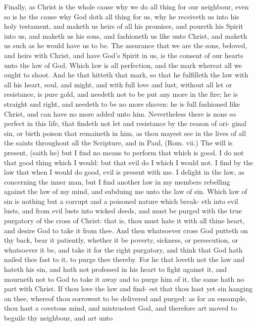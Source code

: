 \documentclass{custom}
\begin{document}
Finally, as Christ is the whole cause why we do all 
thing for our neighbour, even so is he the cause why God 
doth all thing for us, why he receiveth us into his holy 
testament, and maketh us heirs of all his promises, and 
poureth his Spirit into us, and maketh us his sons, and 
fashioneth us like unto Christ, and maketh us such as he 
would have us to be. The assurance that we are the sons, 
beloved, and heirs with Christ, and have God's Spirit in 
us, is the consent of our hearts unto the law of God. 
Which law is all perfection, and the mark whereat all we 
ought to shoot. And he that hitteth that mark, so that 
he fulfilleth the law with all his heart, soul, and might, and 
with full love and lust, without all let or resistance, is pure 
gold, and needeth not to be put any more in the fire; he is 
straight and right, and needeth to be no more shaven: he 
is full fashioned like Christ, and can have no more added 
unto him. Nevertheless there is none so perfect in this 
life, that findeth not let and resistance by the reason of ori- 
ginal sin, or birth poison that remaineth in him, as thou 
mayest see in the lives of all the saints throughout all the 
Scripture, and in Paul, (Rom. vii.) The will is present, 
(saith he) but I find no means to perform that which is 
good. I do not that good thing which I would: but that 
evil do I which I would not. I find by the law that when 
I would do good, evil is present with me. I delight in the 
law, as concerning the inner man, but I find another law 
in my members rebelling against the law of my mind, and 
subduing me unto the law of sin. Which law of sin is 
nothing but a corrupt and a poisoned nature which break- 
eth into evil lusts, and from evil lusts into wicked deeds, and 
must be purged with the true purgatory of the cross of 
Christ: that is, thou must hate it with all thine heart, and 
desire God to take it from thee. And then whatsoever 
cross God putteth on thy back, bear it patiently, whether 
it be poverty, sickness, or persecution, or whatsoever it be, 
and take it for the right purgatory, and think that God 
hath nailed thee fast to it, to purge thee thereby. For he 
that loveth not the law and hateth his sin, and hath not 
professed in his heart to fight against it, and mourneth not 
to God to take it away and to purge him of it, the same 
hath no part with Christ. If thou love the law and find- 
est that thou hast yet sin hanging on thee, whereof thou 
sorrowest to be delivered and purged: as for an ensample, 
thou hast a covetous mind, and mistrustest God, and 
therefore art moved to beguile thy neighbour, and art unto 
\end{document}
